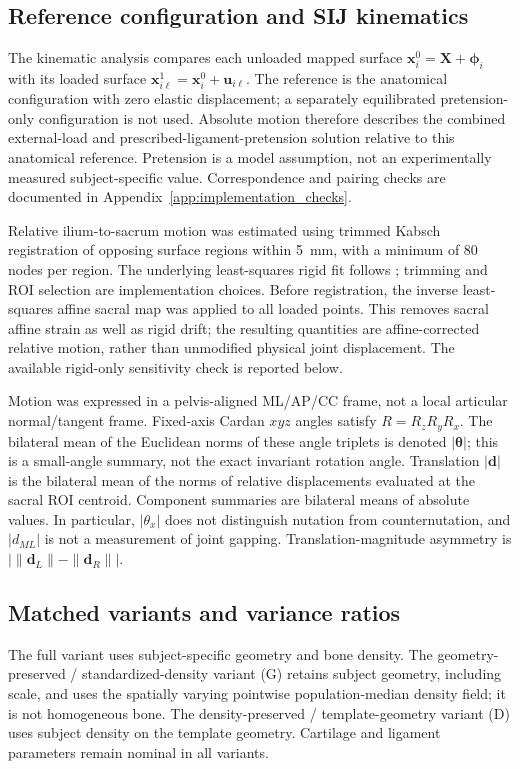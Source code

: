 \subsection{Reference configuration and SIJ kinematics}
The kinematic analysis compares each unloaded mapped surface $\mathbf{x}^0_i=\mathbf{X}+\boldsymbol{\phi}_i$ with its loaded surface $\mathbf{x}^1_{i\ell}=\mathbf{x}^0_i+\mathbf{u}_{i\ell}$. The reference is the anatomical configuration with zero elastic displacement; a separately equilibrated pretension-only configuration is not used. Absolute motion therefore describes the combined external-load and prescribed-ligament-pretension solution relative to this anatomical reference. Pretension is a model assumption, not an experimentally measured subject-specific value. Correspondence and pairing checks are documented in Appendix~\ref{app:implementation_checks}.



Relative ilium-to-sacrum motion was estimated using trimmed Kabsch registration of opposing surface regions within 5~mm, with a minimum of 80 nodes per region. The underlying least-squares rigid fit follows \citet{Kabsch1976}; trimming and ROI selection are implementation choices. Before registration, the inverse least-squares affine sacral map was applied to all loaded points. This removes sacral affine strain as well as rigid drift; the resulting quantities are affine-corrected relative motion, rather than unmodified physical joint displacement. The available rigid-only sensitivity check is reported below.

Motion was expressed in a pelvis-aligned ML/AP/CC frame, not a local articular normal/tangent frame. Fixed-axis Cardan $xyz$ angles satisfy $R=R_zR_yR_x$. The bilateral mean of the Euclidean norms of these angle triplets is denoted $|\boldsymbol{\theta}|$; this is a small-angle summary, not the exact invariant rotation angle. Translation $|\mathbf d|$ is the bilateral mean of the norms of relative displacements evaluated at the sacral ROI centroid. Component summaries are bilateral means of absolute values. In particular, $|\theta_x|$ does not distinguish nutation from counternutation, and $|d_{ML}|$ is not a measurement of joint gapping. Translation-magnitude asymmetry is $\big|\|\mathbf d_L\|-\|\mathbf d_R\|\big|$.

\subsection{Matched variants and variance ratios}
The full variant uses subject-specific geometry and bone density. The geometry-preserved / standardized-density variant (G) retains subject geometry, including scale, and uses the spatially varying pointwise population-median density field; it is not homogeneous bone. The density-preserved / template-geometry variant (D) uses subject density on the template geometry. Cartilage and ligament parameters remain nominal in all variants.

